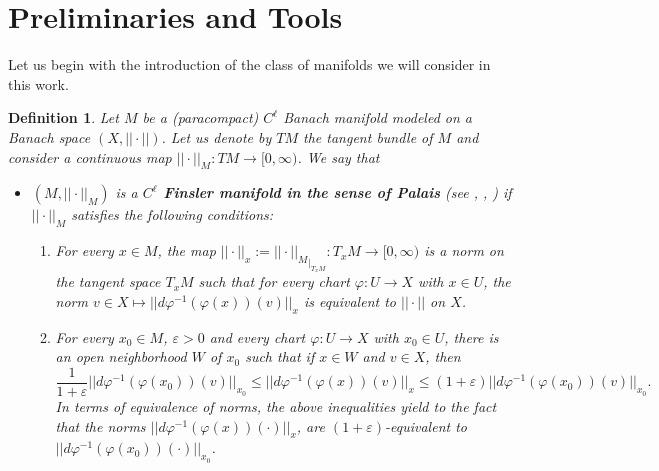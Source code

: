 \documentclass[11pt]{amsart}
\newtheorem{defn}[thm]{Definition}
\numberwithin{equation}{section}
\begin{document}
\section{Preliminaries and Tools}

Let us begin with  the introduction  of the class of manifolds we will consider in this work.

\begin{defn} \label{defFinsler}
Let $M$ be a (paracompact) $C^\ell$ Banach manifold modeled on a Banach space $(X,||\cdot||)$. Let us denote by  $TM$ the tangent  bundle
of $M$ and consider a continuous  map $||\cdot||_M: TM\to [0,\infty)$. We say that

\begin{itemize}

\item[{\bf(F1)}]  $(M,||\cdot||_M)$ is a \textbf{$C^\ell$ Finsler manifold in the sense of Palais} (see \cite{Palais},  \cite{Deim}, \cite{Rabier})
if $||\cdot||_M$ satisfies the following conditions:
\begin{enumerate}
\item[(P1)] For every $x\in M$, the map $||\cdot||_x:={||\cdot||_M}_{\mid_{T_xM}}:T_xM\to [0,\infty)$ is a norm on the tangent space $T_xM$ such that for every chart $\varphi:U\to X$ with $x \in U$, the norm $v\in X \mapsto ||d\varphi^{-1}(\varphi(x))(v)||_x$ is equivalent to $||\cdot||$ on $X$.
\item[(P2)] For every $x_0\in M$, $\varepsilon>0$ and every chart $\varphi:U\to X$ with $x_0\in U$, there is an open neighborhood $W$ of $x_0$  such that if  $x\in W$ and $v\in X$, then
\begin{equation*}\label{palaisdef}
\frac{1}{1+\varepsilon}||d\varphi^{-1}(\varphi(x_0))(v)||_{x_0}\le ||d\varphi^{-1}(\varphi(x))(v)||_{x}\le (1+\varepsilon)||d\varphi^{-1}(\varphi(x_0))(v)||_{x_0}.
\end{equation*}
In terms of equivalence of norms, the above inequalities yield to the fact that the norms $||d\varphi^{-1}(\varphi(x))(\cdot)||_{x}$,
are $(1+\varepsilon)$-equivalent to $||d\varphi^{-1}(\varphi(x_0))(\cdot)||_{x_0}$.
\end{enumerate}


\end{itemize}
\end{defn}
\end{document}
